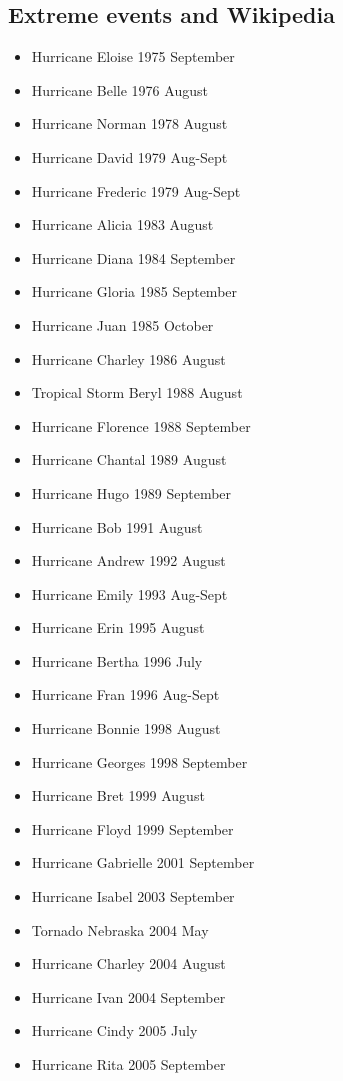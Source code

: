 \documentclass[12pt]{article}
\begin{document}
\subsection{Extreme events and Wikipedia}
\begin{multicols}{2}
\begin{itemize}
\item Hurricane Eloise 1975 September
\item Hurricane Belle 1976 August
\item Hurricane Norman 1978 August
\item Hurricane David 1979 Aug-Sept
\item Hurricane Frederic 1979 Aug-Sept
\item Hurricane Alicia 1983 August
\item Hurricane Diana 1984 September
\item Hurricane Gloria 1985 September
\item Hurricane Juan	1985 October
\item Hurricane Charley 1986 August
\item Tropical Storm Beryl 1988 August
\item Hurricane Florence 1988 September	
\item Hurricane Chantal 1989 August
\item Hurricane Hugo 1989 September
\item Hurricane Bob 1991 August
\item Hurricane Andrew 1992 August
\item Hurricane Emily 1993 Aug-Sept
\item Hurricane Erin 1995 August
\item Hurricane Bertha 1996 July
\item Hurricane Fran 1996 Aug-Sept
\item Hurricane Bonnie 1998 August
\item Hurricane Georges 1998 September
\item Hurricane Bret 1999 August
\item Hurricane Floyd 1999 September
\item Hurricane Gabrielle 2001 September
\item Hurricane Isabel 2003 September
\item Tornado Nebraska 2004 May
\item Hurricane Charley 2004 August
\item Hurricane Ivan 2004 September
\item Hurricane Cindy 2005 July
\item Hurricane Rita 2005 September

\end{itemize}
\end{multicols}
\end{document}
